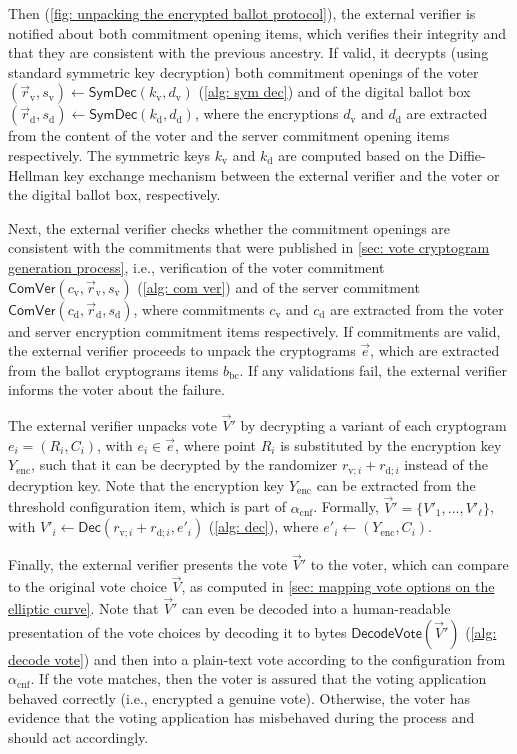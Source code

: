 Then (\cref{fig: unpacking the encrypted ballot protocol}), the external verifier is notified about both commitment opening items, which verifies their integrity and that they are consistent with the previous ancestry. If valid, it decrypts (using standard symmetric key decryption) both commitment openings of the voter $(\vec{r}_\mathrm{v}, s_\mathrm{v}) \gets \mathsf{SymDec}(k_\mathrm{v}, d_\mathrm{v})$ (\cref{alg: sym dec}) and of the digital ballot box $(\vec{r}_\mathrm{d}, s_\mathrm{d}) \gets \mathsf{SymDec}(k_\mathrm{d}, d_\mathrm{d})$, where the encryptions $d_\mathrm{v}$ and $d_\mathrm{d}$ are extracted from the content of the voter and the server commitment opening items respectively. The symmetric keys $k_\mathrm{v}$ and $k_\mathrm{d}$ are computed based on the Diffie-Hellman key exchange mechanism between the external verifier and the voter or the digital ballot box, respectively.

Next, the external verifier checks whether the commitment openings are consistent with the commitments that were published in \cref{sec: vote cryptogram generation process}, i.e., verification of the voter commitment $\mathsf{ComVer}(c_\mathrm{v}, \vec{r}_\mathrm{v}, s_\mathrm{v})$ (\cref{alg: com ver}) and of the server commitment $\mathsf{ComVer}(c_\mathrm{d}, \vec{r}_\mathrm{d}, s_\mathrm{d})$, where commitments $c_\mathrm{v}$ and $c_\mathrm{d}$ are extracted from the voter and server encryption commitment items respectively. If commitments are valid, the external verifier proceeds to unpack the cryptograms $\vec{e}$, which are extracted from the ballot cryptograms items $b_\mathrm{bc}$. If any validations fail, the external verifier informs the voter about the failure.

The external verifier unpacks vote $\vec{V}'$ by decrypting a variant of each cryptogram $e_i = (R_i, C_i)$, with $e_i \in \vec{e}$, where point $R_i$ is substituted by the encryption key $Y_\mathrm{enc}$, such that it can be decrypted by the randomizer $r_{\mathrm{v}; i} + r_{\mathrm{d}; i}$ instead of the decryption key. Note that the encryption key $Y_\mathrm{enc}$ can be extracted from the threshold configuration item, which is part of $\alpha_\mathrm{cnf}$. Formally, $\vec{V}' = \{ V'_1, ..., V'_\ell \}$, with $V'_i \gets \mathsf{Dec}(r_{\mathrm{v}; i} + r_{\mathrm{d}; i}, e'_i)$ (\cref{alg: dec}), where $e'_i \gets (Y_\mathrm{enc}, C_i)$.

Finally, the external verifier presents the vote $\vec{V}'$ to the voter, which can compare to the original vote choice $\vec{V}$, as computed in \cref{sec: mapping vote options on the elliptic curve}. Note that $\vec{V}'$ can even be decoded into a human-readable presentation of the vote choices by decoding it to bytes $\mathsf{DecodeVote}(\vec{V}')$ (\cref{alg: decode vote}) and then into a plain-text vote according to the configuration from $\alpha_\mathrm{cnf}$. If the vote matches, then the voter is assured that the voting application behaved correctly (i.e., encrypted a genuine vote). Otherwise, the voter has evidence that the voting application has misbehaved during the process and should act accordingly.

